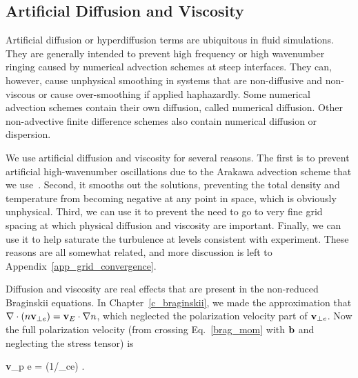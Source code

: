 \subsection{Artificial Diffusion and Viscosity}
\label{ss_art_diff}

Artificial diffusion or hyperdiffusion terms are ubiquitous in fluid simulations. They are generally intended to prevent high frequency or high wavenumber ringing caused by numerical advection
schemes at steep interfaces. They can, however, cause unphysical smoothing in systems that are non-diffusive and non-viscous or cause over-smoothing if applied haphazardly. Some numerical
advection schemes contain their own diffusion, called numerical diffusion. Other non-advective finite difference schemes also contain numerical diffusion or dispersion.

We use artificial diffusion and viscosity for several reasons. The first is to prevent artificial high-wavenumber oscillations due to the Arakawa advection scheme that we use~\cite{arakawa1966}.
Second, it smooths out the solutions, preventing the total density and temperature from becoming negative at any point in space, which is obviously unphysical. Third, we can use it
to prevent the need to go to very fine grid spacing at which physical diffusion and viscosity are important. Finally, we can use it to help saturate the turbulence at levels consistent with experiment.
These reasons are all somewhat related, and more discussion is left to Appendix~\ref{app_grid_convergence}.

Diffusion and viscosity are real effects that are present in the non-reduced Braginskii equations. In Chapter~\ref{c_braginskii}, we made the approximation that 
$\nabla \cdot (n {\bf v}_{\perp e}) = {\bf v}_{E} \cdot \nabla n$, which neglected the polarization velocity part of ${\bf v}_{\perp e}$. Now the full polarization velocity (from crossing Eq.~\ref{brag_mom}
with ${\bf b}$ and neglecting the stress tensor) is

\beq
\label{e_pol_v}
{\bf v}_{p e} = (1/\omega_{ce}) .
\eeq

